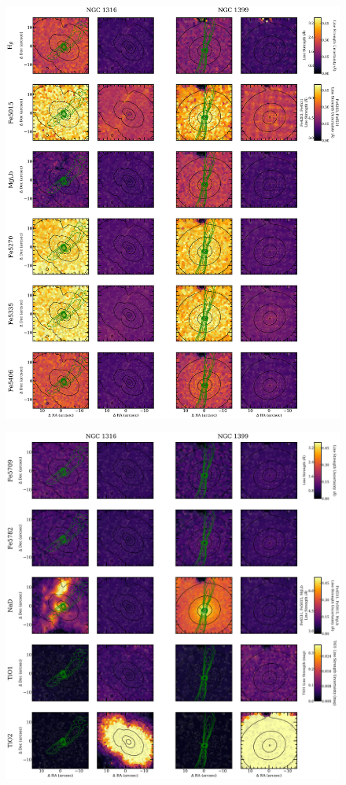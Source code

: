 {{\begin{figure}
			\includegraphics[height=0.94\textheight]{chapter4/muse/abs2.png}
		\end{figure}
		\begin{figure}
			\centering
			\includegraphics[height=0.54\textheight]{chapter4/muse/abs2b.png}
		\end{figure}


}}
